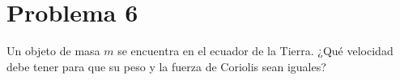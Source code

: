 \documentclass[a4paper,10pt]{article}
\numberwithin{equation}{section}
\begin{document}
% 
% 
% 
% 






\section{Problema 6}

Un objeto de masa $m$ se encuentra en el ecuador de la Tierra. ¿Qué velocidad debe 
tener para que su peso y la fuerza de Coriolis sean iguales?

\vspace{.3cm}
\end{document}
